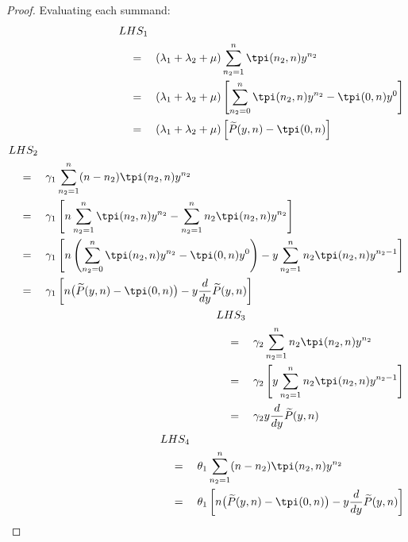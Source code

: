 \begin{proof}
    Evaluating each summand:
    \begin{align}
        \begin{split}
            & LHS_1 \\
            & \quad = \quad (\lambda_1 + \lambda_2 + \mu) \sum_{n_2=1}^{n} \tpi(n_2,n) y^{n_2} \\
            & \quad = \quad (\lambda_1 + \lambda_2 + \mu) \left[ \sum_{n_2=0}^{n} \tpi(n_2,n) y^{n_2} - \tpi(0,n) y^0 \right] \\
            & \quad = \quad (\lambda_1 + \lambda_2 + \mu) \left[ \widetilde{P}(y,n) - \tpi(0,n) \right]
        \end{split} \\
        \begin{split}
            & LHS_2 \\
            & \quad = \quad \gamma_1 \sum_{n_2=1}^{n} (n-n_2) \tpi(n_2,n) y^{n_2} \\
            & \quad = \quad \gamma_1 \left[ n \sum_{n_2=1}^{n} \tpi(n_2,n) y^{n_2} - \sum_{n_2=1}^{n} n_2 \tpi(n_2,n) y^{n_2} \right] \\
            & \quad = \quad \gamma_1 \left[ n \left( \sum_{n_2=0}^{n} \tpi(n_2,n) y^{n_2} - \tpi(0,n) y^0 \right) - y \sum_{n_2=1}^{n} n_2 \tpi(n_2,n) y^{n_2-1} \right] \\
            & \quad = \quad \gamma_1 \left[ n \big( \widetilde{P}(y,n) - \tpi(0,n) \big) - y \frac{d}{dy} \widetilde{P}(y,n) \right]
        \end{split} \\
        \begin{split}
            & LHS_3 \\
            & \quad = \quad \gamma_2 \sum_{n_2=1}^{n} n_2 \tpi(n_2,n) y^{n_2} \\
            & \quad = \quad \gamma_2 \left[ y \sum_{n_2=1}^{n} n_2 \tpi(n_2,n) y^{n_2-1} \right] \\
            & \quad = \quad \gamma_2 y \frac{d}{dy} \widetilde{P}(y,n)
        \end{split} \\
        \begin{split}
            & LHS_4 \\
            & \quad = \quad \theta_1 \sum_{n_2=1}^{n} (n-n_2) \tpi(n_2,n) y^{n_2} \\
            & \quad = \quad \theta_1 \left[ n \big( \widetilde{P}(y,n) - \tpi(0,n) \big) - y \frac{d}{dy} \widetilde{P}(y,n) \right]
        \end{split} \\

\end{align}
\end{proof}
